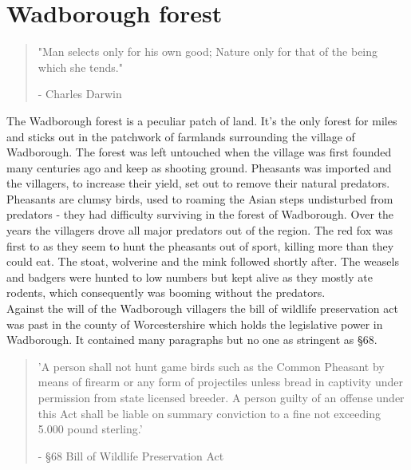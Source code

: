 \documentclass[smalldemyvopaper,11pt,twoside,onecolumn,openright,extrafontsizes]{memoir}
\begin{document}
\mainmatter
\chapter{Wadborough forest}
\vspace{-1.3cm}
\begin{localsize}{10}
	\begin{quote}
		"Man selects only for his own good; Nature only for that of the being which she tends."
		\begin{flushright}- Charles Darwin\end{flushright}
	\end{quote} 
\end{localsize}
\vspace{1cm}

The Wadborough forest is a peculiar patch of land. It's the only forest for miles and sticks out in the patchwork of farmlands surrounding the village of Wadborough. The forest was left untouched when the village was first founded many centuries ago and keep as shooting ground. Pheasants was imported and the villagers, to increase their yield, set out to remove their natural predators. \\

Pheasants are clumsy birds, used to roaming the Asian steps undisturbed from predators - they had difficulty surviving in the forest of Wadborough. Over the years the villagers drove all major predators out of the region. The red fox was first to as they seem to hunt the pheasants out of sport, killing more than they could eat. The stoat, wolverine and the mink followed shortly after. The weasels and badgers were hunted to low numbers but kept alive as they mostly ate rodents, which consequently was booming without the predators. \\

Against the will of the Wadborough villagers the bill of wildlife preservation act was past in the county of Worcestershire which holds the legislative power in Wadborough. It contained many paragraphs but no one as stringent as §68.

\begin{localsize}{10}
\begin{quote}
'A person shall not hunt game birds such as the Common Pheasant by means of firearm or any form of projectiles unless bread in captivity under permission from state licensed breeder. A person guilty of an offense under this Act shall be liable on summary conviction to a fine not exceeding 5.000 pound sterling.'
\begin{flushright}- §68 Bill of Wildlife Preservation Act\end{flushright}
\end{quote} 
\end{localsize}
\end{document}
